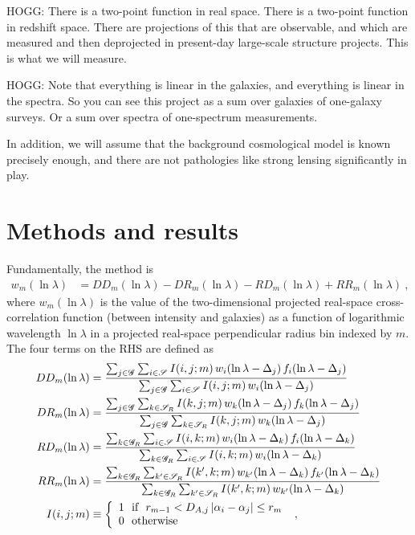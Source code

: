 \documentclass{article}
\newcommand{\set}[1]{\mathscr{#1}}
\begin{document}
HOGG: There is a two-point function in real space. There is a two-point function in redshift space. There are projections of this that are observable, and which are measured and then deprojected in present-day large-scale structure projects. This is what we will measure.

HOGG: Note that everything is linear in the galaxies, and everything is linear in the spectra. So you can see this project as a sum over galaxies of one-galaxy surveys. Or a sum over spectra of one-spectrum measurements.

In addition, we will assume that the background cosmological model is known precisely enough, and there are not pathologies like strong lensing significantly in play.

\section{Methods and results}\label{sec:method}
Fundamentally, the method is
\begin{align}
    w_m(\ln\lambda) &= DD_m(\ln\lambda) - DR_m(\ln\lambda) - RD_m(\ln\lambda) + RR_m(\ln\lambda) ~,\label{eq:ls}
\end{align}
where $w_m(\ln\lambda)$ is the value of the two-dimensional projected real-space cross-correlation function (between intensity and galaxies) as a function of logarithmic wavelength $\ln\lambda$ in a projected real-space perpendicular radius bin indexed by $m$.
The four terms on the RHS are defined as
\begin{align}
    DD_m(\ln\lambda) &= \frac{%
    \sum_{j\in\set{G}}\sum_{i\in\set{S}} I(i,j;m)\,w_i(\ln\lambda-\Delta_j)\,f_i(\ln\lambda-\Delta_j)}{%
    \sum_{j\in\set{G}}\sum_{i\in\set{S}} I(i,j;m)\,w_i(\ln\lambda-\Delta_j)} \\
    DR_m(\ln\lambda) &= \frac{%
    \sum_{j\in\set{G}}\sum_{k\in\set{S}_R} I(k,j;m)\,w_k(\ln\lambda-\Delta_j)\,f_k(\ln\lambda-\Delta_j)}{%
    \sum_{j\in\set{G}}\sum_{k\in\set{S}_R} I(k,j;m)\,w_k(\ln\lambda-\Delta_j)} \\
    RD_m(\ln\lambda) &= \frac{%
    \sum_{k\in\set{G}_R}\sum_{i\in\set{S}} I(i,k;m)\,w_i(\ln\lambda-\Delta_k)\,f_i(\ln\lambda-\Delta_k)}{%
    \sum_{k\in\set{G}_R}\sum_{i\in\set{S}} I(i,k;m)\,w_i(\ln\lambda-\Delta_k)} \\
    RR_m(\ln\lambda) &= \frac{%
    \sum_{k\in\set{G}_R}\sum_{k'\in\set{S}_R} I(k',k;m)\,w_{k'}(\ln\lambda-\Delta_k)\,f_{k'}(\ln\lambda-\Delta_k)}{%
    \sum_{k\in\set{G}_R}\sum_{k'\in\set{S}_R} I(k',k;m)\,w_{k'}(\ln\lambda-\Delta_k)} \\
    I(i,j;m) &\equiv\left\{\begin{array}{l}1~~\text{if}~~r_{m-1}<D_{A,j}\,|\alpha_i-\alpha_j|\leq r_m \\ 0~~\text{otherwise}\end{array}\right.~,
\end{align}
\end{document}
